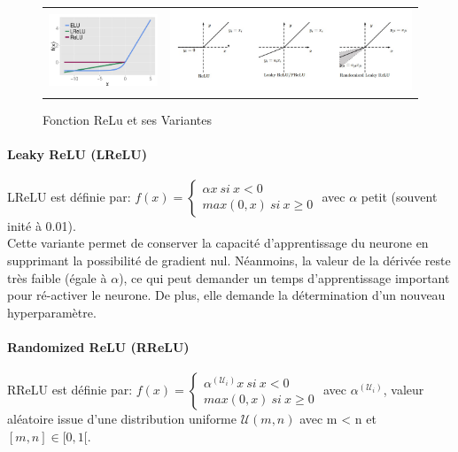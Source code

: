 \begin{figure}
    \begin{tabular}{cc}
    \centering
       \includegraphics[scale=0.4]{./tex/fondamentaux/reluelu.png}  & \includegraphics[scale=0.4]{./tex/fondamentaux/relupic.jpg} \\
    \end{tabular}
    \caption{Fonction ReLu et ses Variantes}
    \label{elurelu}
\end{figure}


\paragraph{Leaky ReLU (LReLU)}
LReLU\cite{randorelu} est définie par: $f(x)=\left\{\begin{array}{ll}\alpha x \ si \ x<0 \\max(0,x) \ si \ x\geq 0\end{array}\right.$ avec $\alpha$ petit (souvent inité à 0.01).\\

\noindent Cette variante permet de conserver la capacité d'apprentissage du neurone en supprimant la possibilité de gradient nul. Néanmoins, la valeur de la dérivée reste très faible (égale à $\alpha$), ce qui peut demander un temps d'apprentissage important pour ré-activer le neurone. De plus, elle demande la détermination d'un nouveau hyperparamètre.

\paragraph{Randomized ReLU (RReLU)}
RReLU\cite{randorelu} est définie par: $f(x)=\left\{\begin{array}{ll}\alpha^{(\mathcal{U}_i)} x \ si \ x<0 \\max(0,x) \ si \ x\geq 0\end{array}\right.$ avec $\alpha^{(\mathcal{U}_i)}$, valeur aléatoire issue d'une distribution uniforme $\mathcal{U}(m,n)$ avec m < n et $[m,n] \in [0,1[$.\\

